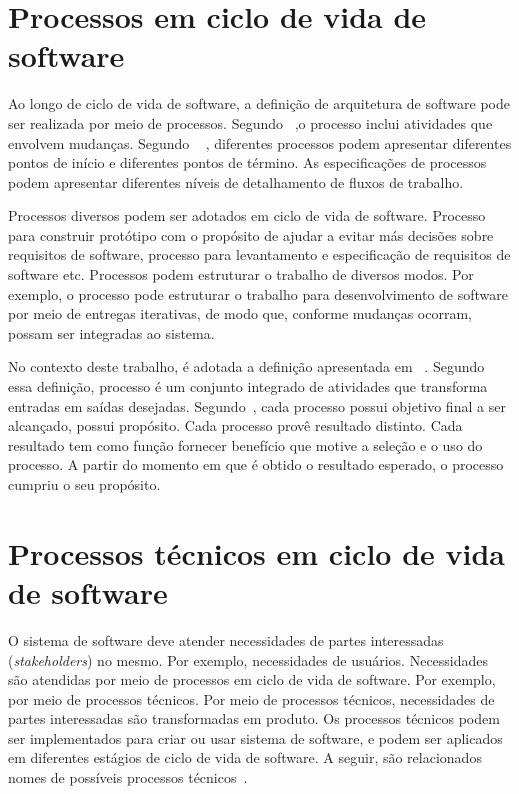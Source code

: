 \section{Processos em ciclo de vida de software}

Ao longo de ciclo de vida de software, a definição de arquitetura de software pode ser realizada por meio de processos. Segundo ~\cite{Sommerville_2011_texbook},o processo inclui atividades que envolvem mudanças. Segundo ~\cite{Sevocab} , diferentes processos podem apresentar diferentes pontos de início e diferentes pontos de término. As especificações de processos podem apresentar diferentes níveis de detalhamento de fluxos de trabalho.

Processos diversos podem ser adotados em ciclo de vida de software. Processo para construir protótipo com o propósito de ajudar a evitar más decisões sobre requisitos de software, processo para levantamento e especificação de requisitos de software etc. Processos podem estruturar o trabalho de diversos modos. Por exemplo, o processo pode estruturar o trabalho para desenvolvimento de software por meio de entregas iterativas, de modo que, conforme mudanças ocorram, possam ser integradas ao sistema.

No contexto deste trabalho, é adotada a definição apresentada em ~\cite{ISO_247483}. Segundo essa definição, processo é um conjunto integrado de atividades que transforma entradas em saídas desejadas. Segundo~\cite{ISO_247483}, cada processo possui objetivo final a ser alcançado, possui propósito. Cada processo provê resultado distinto. Cada resultado tem como função fornecer benefício que motive a seleção e o uso do processo. A partir do momento em que é obtido o resultado esperado, o processo cumpriu o seu propósito.

\section{Processos técnicos em ciclo de vida de software}

O sistema de software deve atender necessidades de partes interessadas (\emph{stakeholders}) no mesmo. Por exemplo, necessidades de usuários. Necessidades são atendidas por meio de processos em ciclo de vida de software. Por exemplo, por meio de processos técnicos. Por meio de processos técnicos, necessidades de partes interessadas são transformadas em produto. Os processos técnicos podem ser implementados para criar ou usar sistema de software, e podem ser aplicados em diferentes estágios de ciclo de vida de software. A seguir, são relacionados nomes de possíveis processos técnicos~\cite{ISO_12207}.

